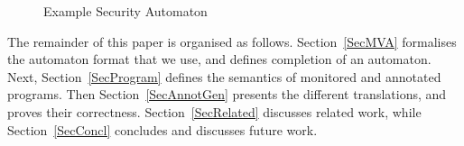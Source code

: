 
\begin{figure}[t]
\begin{center}
\end{center}
\caption{Example Security Automaton}\label{FigExample}
\end{figure}

The remainder of this paper is organised as
follows. Section~\ref{SecMVA} formalises the automaton format that we
use, and defines completion of an automaton. Next,
Section~\ref{SecProgram} defines the semantics of monitored and
annotated programs. Then Section~\ref{SecAnnotGen} presents the
different translations, and proves their
correctness. Section~\ref{SecRelated} discusses related work, while
Section~\ref{SecConcl} concludes and discusses future work.

